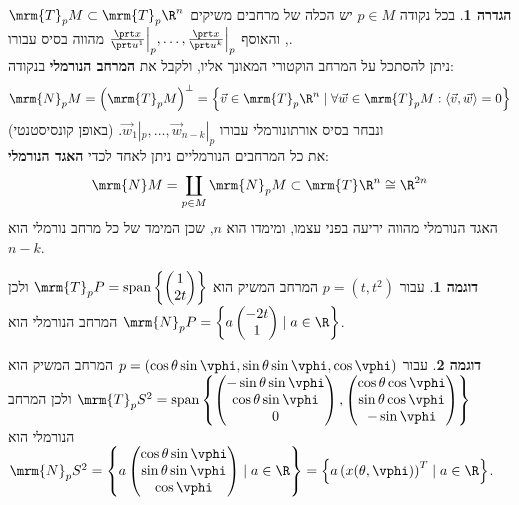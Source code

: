 \documentclass{article}
\theoremstyle{definition}
\newtheorem*{definition*}{הגדרה}
\newtheorem*{example*}{דוגמה}
\DeclareMathOperator{\spn}{span}
\begin{document}
	\begin{definition*}
		בכל נקודה
		$p\in M$
		יש הכלה של מרחבים משיקים
		\(\mrm{T}_p M \subset \mrm{T}_p \R^n\),
		והאוסף
		\(\frac{\prt x}{\prt u^1}\Big|_p,\dotsc,\frac{\prt x}{\prt u^k}\Big|_p\)
		מהווה בסיס עבורו.
		\\
		ניתן להסתכל על המרחב הוקטורי המאונך אליו, ולקבל את \textbf{המרחב הנורמלי} בנקודה:
		\[
			\mrm{N}_p M
			= \left(\mrm{T}_p M\right)^\bot
			= \left\{
				\vec{v} \in \mrm{T}_p \R^n
				\mid
				\forall \vec{w} \in \mrm{T}_p M: \langle \vec{v},\vec{w} \rangle=0
			\right\}
		\]
		ונבחר בסיס אורתונורמלי עבורו
		\(\vec{w}_1|_p,\dotsc,\vec{w}_{n-k}|_p\).
		(באופן קונסיסטנטי)
		\\
		את כל המרחבים הנורמליים ניתן לאחד לכדי \textbf{האגד הנורמלי}:
		\[
			\mrm{N} M
			= \coprod_{p \in M} \mrm{N}_p M
			\subset \mrm{T} \R^n
			\cong \R^{2n}
		\]
		האגד הנורמלי מהווה יריעה בפני עצמו, ומימדו הוא \(n\), שכן המימד של כל מרחב נורמלי הוא \(n-k\).
	\end{definition*}

	\begin{example*}
		עבור
		\(p=(t,t^2)\)
		המרחב המשיק הוא
		\(
			\mrm{T}_p P
			= \spn\left\{
				\begin{pmatrix}
					1\\2t
				\end{pmatrix}
			\right\}
		\)
		ולכן המרחב הנורמלי הוא
		\(
			\mrm{N}_p P
			= \left\{
				a
				\begin{pmatrix}
					-2t\\1
				\end{pmatrix}
				\mid
				a \in \R
			\right\}
		\).
	\end{example*}

	\begin{example*}
		עבור
		\(p=(\cos\theta \sin\vphi, \sin\theta \sin\vphi, \cos\vphi)\)
		המרחב המשיק הוא
		\(
			\mrm{T}_p S^2
			= \spn\left\{
				\begin{pmatrix}
					-\sin\theta \sin\vphi \\ \cos\theta \sin\vphi \\ 0
				\end{pmatrix},
				\begin{pmatrix}
					\cos\theta \cos\vphi \\ \sin\theta \cos\vphi \\ -\sin\vphi
				\end{pmatrix}
			\right\}
		\)
		ולכן המרחב הנורמלי הוא
		\(
			\mrm{N}_p S^2
			= \left\{
				a
				\begin{pmatrix}
					\cos\theta \sin\vphi \\ \sin\theta \sin\vphi \\ \cos\vphi
				\end{pmatrix}
				\mid
				a \in \R
			\right\}
			= \left\{
				a
				\left(x(\theta, \vphi)\right)^T
				\mid
				a \in \R
			\right\}
		\).
	\end{example*}
\end{document}
